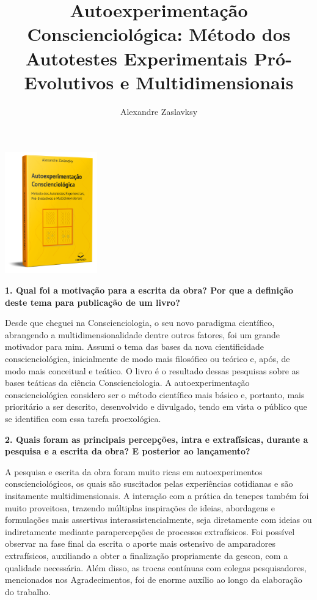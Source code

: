 \documentclass{gescons}
\author{Alexandre Zaslavksy}
\title{Autoexperimentação Conscienciológica: Método dos Autotestes Experimentais Pró-Evolutivos e Multidimensionais}
\begin{document}
    \makeentrevistatitle

    
    \begin{multicols}{2}

\begin{center}
    \includegraphics[width=4cm]{articles/entrevista/mockups/Alexandre-Zas.png}
\end{center}

\textbf{1. Qual foi a motivação para a escrita da obra? Por que a definição deste tema para publicação de um livro?}

Desde que cheguei na Conscienciologia, o seu novo paradigma científico, abrangendo a multidimensionalidade dentre outros fatores, foi um grande motivador para mim. Assumi o tema das bases da nova cientificidade conscienciológica, inicialmente de modo mais filosófico ou teórico e, após, de modo mais conceitual e teático. O livro é o resultado dessas pesquisas sobre as bases teáticas da ciência Conscienciologia. A autoexperimentação conscienciológica considero ser o método científico mais básico e, portanto, mais prioritário a ser descrito, desenvolvido e divulgado, tendo em vista o público que se identifica com essa tarefa proexológica.

\textbf{2.       Quais foram as principais percepções, intra e extrafísicas, durante a pesquisa e a escrita da obra? E posterior ao lançamento?}

A pesquisa e escrita da obra foram muito ricas em autoexperimentos conscienciológicos, os quais são suscitados pelas experiências cotidianas e são insitamente multidimensionais. A interação com a prática da tenepes também foi muito proveitosa, trazendo múltiplas inspirações de ideias, abordagens e formulações mais assertivas interassistencialmente, seja diretamente com ideias ou indiretamente mediante parapercepções de processos extrafísicos. Foi possível observar na fase final da escrita o aporte mais ostensivo de amparadores extrafísicos, auxiliando a obter a finalização propriamente da gescon, com a qualidade necessária. Além disso, as trocas contínuas com colegas pesquisadores, mencionados nos Agradecimentos, foi de enorme auxílio ao longo da elaboração do trabalho.




\end{multicols}
\end{document}

